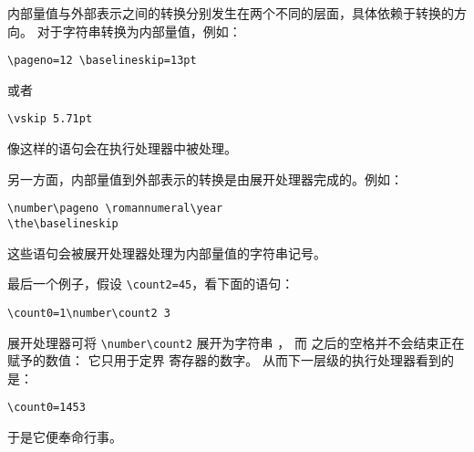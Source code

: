 \documentclass{book}
\begin{document}
内部量值与外部表示之间的转换分别发生在两个不同的层面，具体依赖于转换的方向。
对于字符串转换为内部量值，例如：
\begin{verbatim}
\pageno=12 \baselineskip=13pt
\end{verbatim}
或者
\begin{verbatim}
\vskip 5.71pt
\end{verbatim}
像这样的语句会在执行处理器中被处理。

另一方面，内部量值到外部表示的转换是由展开处理器完成的。例如：
\begin{verbatim}
\number\pageno \romannumeral\year
\the\baselineskip
\end{verbatim}
这些语句会被展开处理器处理为内部量值的字符串记号。

最后一个例子，假设 \verb>\count2=45>，看下面的语句：
\begin{verbatim}
\count0=1\number\count2 3
\end{verbatim}
展开处理器可将 \verb>\number\count2> 展开为字符串 ，
而  之后的空格并不会结束正在赋予的数值：
它只用于定界  寄存器的数字。
从而下一层级的执行处理器看到的是：
\begin{verbatim}
\count0=1453
\end{verbatim}
于是它便奉命行事。


\endofchapter
\end{document}
